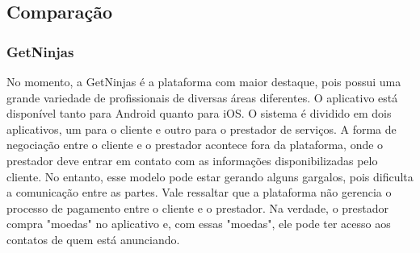
\subsection{Comparação}
\subsubsection{GetNinjas}
No momento, a GetNinjas é a plataforma com maior destaque, pois possui uma grande variedade de profissionais de diversas áreas diferentes.
O aplicativo está disponível tanto para Android quanto para iOS. O sistema é dividido em dois aplicativos, um para o cliente e outro para o
prestador de serviços. A forma de negociação entre o cliente e o prestador acontece fora da plataforma, onde o prestador deve entrar em contato com as informações disponibilizadas pelo cliente. No entanto, esse modelo pode estar gerando alguns gargalos, pois dificulta a comunicação entre as partes. Vale ressaltar que a plataforma não gerencia o processo de pagamento entre o cliente e o prestador. Na verdade, o prestador compra "moedas" no aplicativo e, com essas "moedas", ele pode ter acesso aos contatos de quem está anunciando.
